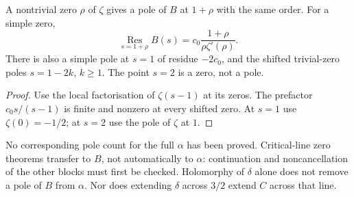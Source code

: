 \begin{proposition}
\label{prop:a12-poles}
A nontrivial zero $\rho$ of $\zeta$ gives a pole of $B$ at $1+\rho$ with
the same order. For a simple zero,
\begin{equation}
\label{eq:a12-residue}
\operatorname*{Res}_{s=1+\rho}B(s)
=c_0\frac{1+\rho}{\rho\zeta'(\rho)}.
\end{equation}
There is also a simple pole at $s=1$ of residue $-2c_0$, and the shifted
trivial-zero poles $s=1-2k$, $k\ge1$. The point $s=2$ is a zero, not a pole.
\end{proposition}
\begin{proof}
Use the local factorisation of $\zeta(s-1)$ at its zeros.
The prefactor $c_0s/(s-1)$ is finite and nonzero at every shifted zero.
At $s=1$ use $\zeta(0)=-1/2$; at $s=2$ use the pole of $\zeta$ at $1$.
\end{proof}

No corresponding pole count for the full $\alpha$ has been proved.
Critical-line zero theorems transfer to $B$, not automatically to $\alpha$:
continuation and noncancellation of the other blocks must first be checked.
Holomorphy of $\delta$ alone does not remove a pole of $B$ from $\alpha$.
Nor does extending $\delta$ across $3/2$ extend $C$ across that line.

